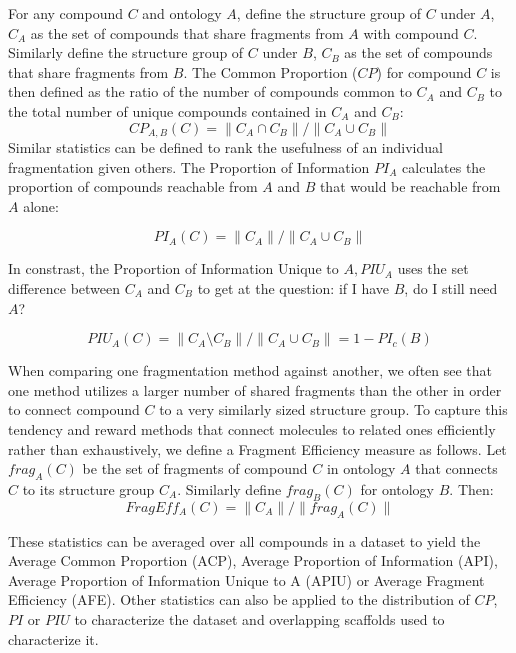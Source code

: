\documentclass[journal=jacsat,manuscript=article]{achemso}
\begin{document}
For any compound $C$ and ontology $A$, define the structure group of
$C$ under $A$, $C_A$ as the set of compounds that share fragments from
$A$ with compound $C$. Similarly define the structure group of $C$
under $B$, $C_B$ as the set of compounds that share fragments from
$B$. The Common Proportion ($CP$) for compound $C$ is then defined as
the ratio of the number of compounds common to $C_A$ and $C_B$ to the
total number of unique compounds contained in $C_A$ and $C_B$:
\begin{equation}
CP_{A,B}(C) = \| C_A \cap C_B \| / \| C_A \cup C_B \|
\end{equation}
Similar statistics can be defined to rank the usefulness of an
individual fragmentation given others. The Proportion of Information
$PI_A$ calculates the proportion of compounds reachable from $A$ and
$B$ that would be reachable from $A$ alone:

\begin{equation}
PI_A(C) = \| C_A \| / \| C_A \cup C_B \|
\end{equation}

In constrast, the Proportion of Information Unique to $A, PIU_A$ uses the set difference between $C_A$ and $C_B$ to get at the question: if I have $B$, do I still need $A$? 

\begin{equation}
 PIU_A(C) = \| C_A \setminus C_B \| / \| C_A \cup C_B \| = 1 - PI_c(B)
 \end{equation}
  
When comparing one fragmentation method against another, we often see that one method utilizes a larger number of shared fragments than the other in order to connect compound $C$ to a very similarly sized structure group. To capture this tendency and reward methods that connect molecules to related ones efficiently rather than exhaustively, we define a Fragment Efficiency measure as follows. Let $frag_A(C)$ be the set of fragments of compound $C$ in ontology $A$ that connects $C$ to its structure group $C_A$. Similarly define $frag_B(C)$ for ontology $B$. Then: 
\begin{equation}
FragEff_A(C) = \| C_A \| / \| frag_A(C) \|
\end{equation}


These statistics can be averaged over all compounds in a dataset to yield the Average Common Proportion (ACP), Average Proportion of Information (API), Average Proportion of Information Unique to A (APIU) or Average Fragment Efficiency (AFE).  Other statistics can also be applied to the distribution of $CP$, $PI$ or $PIU$ to characterize the dataset and overlapping scaffolds used to characterize it.
\end{document}

